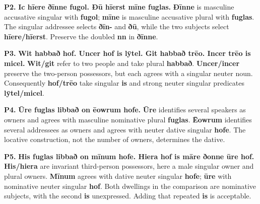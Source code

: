 \par\begin{minipage}{\linewidth}\raggedright
\textbf{P2.} \textbf{Ic hīere ðīnne fugol. Ðū hīerst mīne fuglas.} \textbf{Ðīnne} is masculine accusative singular with \textbf{fugol}; \textbf{mīne} is masculine accusative plural with \textbf{fuglas}. The singular addressee selects \textbf{ðīn-} and \textbf{ðū}, while the two subjects select \textbf{hīere/\allowbreak{}hīerst}. Preserve the doubled \textbf{nn} in \textbf{ðīnne}.

\end{minipage}\par\addvspace{4pt}

\par\begin{minipage}{\linewidth}\raggedright
\textbf{P3.} \textbf{Wit habbað hof. Uncer hof is lȳtel. Git habbað trēo. Incer trēo is micel.} \textbf{Wit/\allowbreak{}git} refer to two people and take plural \textbf{habbað}. \textbf{Uncer/\allowbreak{}incer} preserve the two-person possessors, but each agrees with a singular neuter noun. Consequently \textbf{hof/\allowbreak{}trēo} take singular \textbf{is} and strong neuter singular predicates \textbf{lȳtel/\allowbreak{}micel}.

\end{minipage}\par\addvspace{4pt}

\par\begin{minipage}{\linewidth}\raggedright
\textbf{P4.} \textbf{Ūre fuglas libbað on ēowrum hofe.} \textbf{Ūre} identifies several speakers as owners and agrees with masculine nominative plural \textbf{fuglas}. \textbf{Ēowrum} identifies several addressees as owners and agrees with neuter dative singular \textbf{hofe}. The locative construction, not the number of owners, determines the dative.

\end{minipage}\par\addvspace{4pt}

\par\begin{minipage}{\linewidth}\raggedright
\textbf{P5.} \textbf{His fuglas libbað on mīnum hofe. Hiera hof is māre ðonne ūre hof.} \textbf{His/\allowbreak{}hiera} are invariant third-person possessors, here a male singular owner and plural owners. \textbf{Mīnum} agrees with dative neuter singular \textbf{hofe}; \textbf{ūre} with nominative neuter singular \textbf{hof}. Both dwellings in the comparison are nominative subjects, with the second \textbf{is} unexpressed. Adding that repeated \textbf{is} is acceptable.

\end{minipage}\par\addvspace{4pt}

